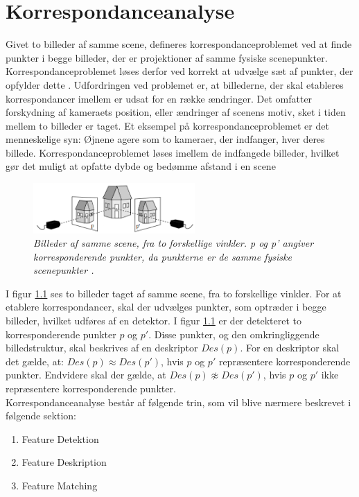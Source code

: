 \chapter{Korrespondanceanalyse} \label{sec:Kor}

Givet to billeder af samme scene, defineres korrespondanceproblemet ved at finde punkter i begge billeder, der er projektioner af samme fysiske scenepunkter. Korrespondanceproblemet løses derfor ved korrekt at udvælge sæt af punkter, der opfylder dette \cite{Stefano}.  Udfordringen ved problemet er, at billederne, der skal etableres korrespondancer imellem er udsat for en række ændringer. Det omfatter forskydning af kameraets position, eller ændringer af scenens motiv, sket i tiden mellem to billeder er taget. Et eksempel på korrespondanceproblemet er det menneskelige syn: Øjnene agere som to kameraer, der indfanger, hver deres billede. Korrespondanceproblemet løses imellem de indfangede billeder, hvilket gør det muligt at opfatte dybde og bedømme afstand i en scene 
\begin{figure}[H]
    \centering
    \includegraphics[width=0.55\textwidth]{fig/3.png}
     \vspace{-1em}
    \begin{center}    
       \caption{{\footnotesize \textit{Billeder af samme scene, fra to forskellige vinkler. p og p' angiver korresponderende punkter, da punkterne er de samme fysiske scenepunkter \cite{kim}.}}}
    \label{fig:1}
     \end{center}
     \vspace{-2.5em}
  \end{figure} \noindent
I figur \ref{fig:1} ses to billeder taget af samme scene, fra to forskellige vinkler. For at etablere korrespondancer, skal der udvælges punkter, som optræder i begge billeder, hvilket udføres af en detektor. I figur \ref{fig:1} er der detekteret to korresponderende punkter $p$ og $p'$. Disse punkter, og den omkringliggende billedstruktur, skal beskrives af en deskriptor $Des(p)$. %
For en deskriptor skal det gælde, at: $Des(p)\approx Des(p')$, hvis $p$ og $p'$ repræsentere korresponderende punkter. Endvidere skal der gælde, at $Des(p)\not \approx Des(p')$, hvis $p$ og $p'$ ikke repræsentere korresponderende punkter. \\
Korrespondanceanalyse består af følgende trin, som vil blive nærmere beskrevet i følgende sektion:
\begin{enumerate}
\item{Feature Detektion}
\item{Feature Deskription}
\item{Feature Matching}
\end{enumerate}


